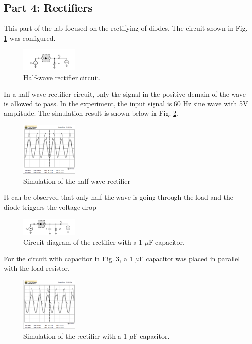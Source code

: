\documentclass[letterpaper, 10 pt, conference]{ieeeconf}  %
\begin{document}
    \subsection{Part 4: Rectifiers}
    This part of the lab focused on the rectifying of diodes. The circuit
    shown in Fig. \ref{fig:rectifier_1} was configured.
    \begin{figure}[h]
      \centering
        \includegraphics[width=0.25\textwidth]{images/rectifier_circuit.png}
      \caption{Half-wave rectifier circuit.}
      \label{fig:rectifier_1}
    \end{figure}
    \par In a half-wave rectifier circuit, only the signal in the positive domain of
    the wave is allowed to pass. In the experiment, the input signal is 60 Hz sine wave
    with 5V amplitude. The simulation result is shown below in Fig. \ref{fig:rectifier_2}.
    \begin{figure}[h]
      \centering
        \includegraphics[width=0.25\textwidth]{images/halfwave.png}
      \caption{Simulation of the half-wave-rectifier}
      \label{fig:rectifier_2}
    \end{figure}
    \par It can be observed that only half the wave is going through the load and the diode
    triggers the voltage drop.
    \begin{figure}[h]
      \centering
        \includegraphics[width=0.25\textwidth]{images/rectifier_circuit_2.png}
      \caption{Circuit diagram of the rectifier with a 1 $\mu$F capacitor.}
      \label{fig:rectifier_3}
    \end{figure}
    \par For the circuit with capacitor in Fig. \ref{fig:rectifier_3}, a 1 $\mu$F
    capacitor was placed in parallel with the load resistor.
    \begin{figure}[h]
      \centering
        \includegraphics[width=0.25\textwidth]{images/halfwave_1miuf.png}
      \caption{Simulation of the rectifier with a 1 $\mu$F capacitor.}
      \label{fig:rectifier_4}
    \end{figure}
\end{document}
